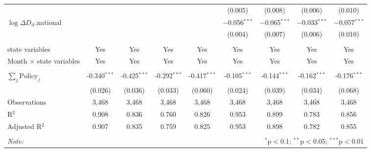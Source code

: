 \begin{tabular}{@{\extracolsep{1pt}}lcccccccc}
  &  &  &  &  & (0.005) & (0.008) & (0.006) & (0.010) \\ 
  $\log \Delta D_{it}$.national &  &  &  &  & $-$0.056$^{***}$ & $-$0.065$^{***}$ & $-$0.033$^{***}$ & $-$0.057$^{***}$ \\ 
  &  &  &  &  & (0.004) & (0.007) & (0.006) & (0.010) \\ 
 \hline \\[-1.8ex] 
state variables & Yes & Yes & Yes & Yes & Yes & Yes & Yes & Yes \\ 
Month $\times$ state variables & Yes & Yes & Yes & Yes & Yes & Yes & Yes & Yes \\ 
\hline \\[-1.8ex] 
$\sum_j \mathrm{Policy}_j$ & -0.340$^{***}$ & -0.425$^{***}$ & -0.292$^{***}$ & -0.417$^{***}$ & -0.105$^{***}$ & -0.144$^{***}$ & -0.162$^{***}$ & -0.176$^{***}$ \\ 
 & (0.026) & (0.036) & (0.033) & (0.060) & (0.024) & (0.039) & (0.034) & (0.068) \\ 
Observations & 3,468 & 3,468 & 3,468 & 3,468 & 3,468 & 3,468 & 3,468 & 3,468 \\ 
R$^{2}$ & 0.908 & 0.836 & 0.760 & 0.826 & 0.953 & 0.899 & 0.783 & 0.856 \\ 
Adjusted R$^{2}$ & 0.907 & 0.835 & 0.759 & 0.825 & 0.953 & 0.898 & 0.782 & 0.855 \\ 
\hline 
\hline \\[-1.8ex] 
\textit{Note:}  & \multicolumn{8}{r}{$^{*}$p$<$0.1; $^{**}$p$<$0.05; $^{***}$p$<$0.01} \\ 
\end{tabular} 